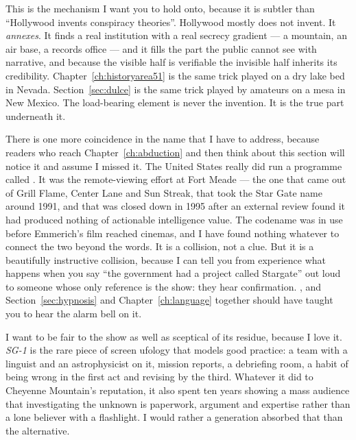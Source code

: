 This is the mechanism I want you to hold onto, because it is subtler than ``Hollywood invents
conspiracy theories''. Hollywood mostly does not invent. It \emph{annexes}. It finds a real
institution with a real secrecy gradient --- a mountain, an air base, a records office --- and it
fills the part the public cannot see with narrative, and because the visible half is verifiable the
invisible half inherits its credibility. Chapter~\ref{ch:historyarea51} is the same trick played on a
dry lake bed in Nevada. Section~\ref{sec:dulce} is the same trick played by amateurs on a mesa in New
Mexico. The load-bearing element is never the invention. It is the true part underneath it.

There is one more coincidence in the name that I have to address, because readers who reach
Chapter~\ref{ch:abduction} and then think about this section will notice it and assume I missed it.
The United States really did run a programme called . It was the remote-viewing
effort at Fort Meade --- the one that came out of Grill Flame, Center Lane and Sun Streak, that took
the Star Gate name around 1991, and that was closed down in 1995 after an external review found it
had produced nothing of actionable intelligence value. The codename was in use before Emmerich's film
reached cinemas, and I have found nothing whatever to connect the two beyond the words. It is a
collision, not a clue. But it is a beautifully instructive collision, because I can tell you from
experience what happens when you say ``the government had a project called Stargate'' out loud to
someone whose only reference is the show: they hear confirmation. , and
Section~\ref{sec:hypnosis} and Chapter~\ref{ch:language} together should have taught you to hear the
alarm bell on it.

I want to be fair to the show as well as sceptical of its residue, because I love it. \emph{SG-1} is
the rare piece of screen ufology that models good practice: a team with a linguist and an
astrophysicist on it, mission reports, a debriefing room, a habit of being wrong in the first act and
revising by the third. Whatever it did to Cheyenne Mountain's reputation, it also spent ten years
showing a mass audience that investigating the unknown is paperwork, argument and expertise rather
than a lone believer with a flashlight. I would rather a generation absorbed that than the
alternative.

